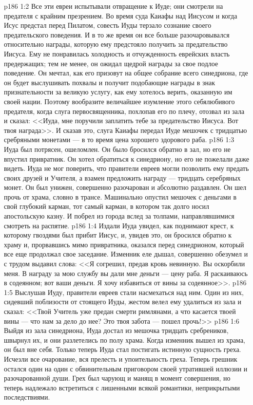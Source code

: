\vs p186 1:2 Все эти евреи испытывали отвращение к Иуде; они смотрели на предателя с крайним презрением. Во время суда Каиафы над Иисусом и когда Исус предстал перед Пилатом, совесть Иуды терзало сознание своего предательского поведения. И в то же время он все больше разочаровывался относительно награды, которую ему предстояло получить за предательство Иисуса. Ему не понравилась холодность и отчужденность еврейских власть предержащих; тем не менее, он ожидал щедрой награды за свое подлое поведение. Он мечтал, как его призовут на общее собрание всего синедриона, где он будет выслушивать похвалы и получит подобающие награды в знак признательности за великую услугу, как ему хотелось верить, оказанную им своей нации. Поэтому вообразите величайшее изумление этого себялюбивого предателя, когда слуга первосвященника, похлопав его по плечу, отозвал из зала и сказал: <<Иуда, мне поручили заплатить тебе за предательство Иисуса. Вот твоя награда>>. И сказав это, слуга Каиафы передал Иуде мешочек с тридцатью сребряными монетами --- в то время цена хорошего здорового раба.
\vs p186 1:3 Иуда был потрясен, ошеломлен. Он было бросился обратно в зал, но его не впустил привратник. Он хотел обратиться к синедриону, но его не пожелали даже видеть. Иуда не мог поверить, что правители евреев могли позволить ему предать своих друзей и Учителя, а взамен предложить награду --- тридцать серебряных монет. Он был унижен, совершенно разочарован и абсолютно раздавлен. Он шел прочь от храма, словно в трансе. Машинально опустил мешочек с деньгами в свой глубокий карман, тот самый карман, в котором так долго носил апостольскую казну. И побрел из города вслед за толпами, направлявшимися смотреть на распятие.
\vs p186 1:4 Издали Иуда увидел, как поднимают крест, к которому гвоздями был прибит Иисус, и, увидев это, он бросился обратно к храму и, прорвавшись мимо привратника, оказался перед синедрионом, который все еще продолжал свое заседание. Изменник еле дышал, совершенно обезумел и с трудом выдавил слова: <<Я согрешил, предав кровь невинную. Вы оскорбили меня. В награду за мою службу вы дали мне деньги --- цену раба. Я раскаиваюсь в содеянном; вот ваши деньги. Я хочу избавиться от вины за содеянное>>.
\vs p186 1:5 Выслушав Иуду, правители евреев стали насмехаться над ним. Один из них, сидевший поблизости от стоящего Иуды, жестом велел ему удалиться из зала и сказал: <<Твой Учитель уже предан смерти римлянами, а что касается твоей вины --- что нам за дело до нее? Это твоя забота --- пошел прочь!>>
\vs p186 1:6 Выйдя из зала синедриона, Иуда достал из мешочка тридцать сребреников, швырнул их, и они разлетелись по полу храма. Когда изменник вышел из храма, он был вне себя. Только теперь Иуда стал постигать истинную сущность греха. Исчезли все очарование, вся прелесть и упоительность греха. Теперь грешник остался один на один с обвинительным приговором своей утратившей иллюзии и разочарованной души. Грех был чарующ и манящ в момент совершения, но теперь надлежало встретиться с лишенными всякой романтики, неприкрытыми последствиями.
